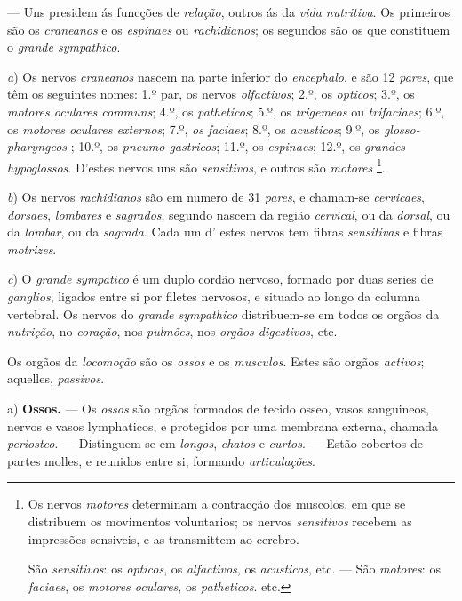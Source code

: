 --- Uns presidem ás funcções de \emph{relação}, outros ás da \emph{vida nutritiva}. Os primeiros são os \emph{craneanos} e os \emph{espinaes} ou \emph{rachidianos}; os segundos são os que constituem o \emph{grande sympathico}.

\emph{a}) Os nervos \emph{craneanos} nascem na parte inferior do \emph{encephalo}, e são 12 \emph{pares}, que têm os seguintes nomes: 1.º par, os nervos \emph{olfactivos}; 2.º, os \emph{opticos}; 3.º, os \emph{motores oculares communs}; 4.º, os \emph{patheticos}; 5.º, os \emph{trigemeos} ou \emph{trifaciaes}; 6.º, os \emph{motores oculares externos}; 7.º, \emph{os faciaes}; 8.º, os \emph{acusticos}; 9.º, os \emph{glosso-pharyngeos} ; 10.º, os \emph{pneumo-gastricos}; 11.º, os \emph{espinaes}; 12.º, os \emph{grandes hypoglossos}. D'estes nervos uns são \emph{sensitivos}, e outros são \emph{motores} \footnote{Os nervos \emph{motores} determinam a contracção dos muscolos, em que se distribuem os movimentos voluntarios; os nervos \emph{sensitivos} recebem as impressões sensiveis, e as transmittem ao cerebro.\par São \emph{sensitivos}: os \emph{opticos}, os \emph{alfactivos}, os \emph{acusticos}, etc. --- São \emph{motores}: os \emph{faciaes}, os \emph{motores oculares}, os \emph{patheticos}. etc.}.

\emph{b}) Os nervos \emph{rachidianos} são em numero de 31 \emph{pares}, e chamam-se \emph{cervicaes}, \emph{dorsaes}, \emph{lombares} e \emph{sagrados}, segundo nascem da região \emph{cervical}, ou da \emph{dorsal}, ou da \emph{lombar}, ou da \emph{sagrada}. Cada um d' estes nervos tem fibras \emph{sensitivas} e fibras \emph{motrizes}.

\emph{c}) O \emph{grande sympatico} é um duplo cordão nervoso, formado por duas series de \emph{ganglios}, ligados entre si por filetes nervosos, e situado ao longo da columna vertebral. Os nervos do \emph{grande sympathico} distribuem-se em todos os orgãos da \emph{nutrição}, no \emph{coração}, nos \emph{pulmões}, nos \emph{orgãos digestivos}, etc.


 
Os orgãos da \emph{locomoção} são os \emph{ossos} e os \emph{musculos}. Estes são orgãos \emph{activos}; aquelles, \emph{passivos}.

a) \textbf{Ossos.} --- Os \emph{ossos} são orgãos formados de tecido osseo, vasos sanguineos, nervos e vasos lymphaticos, e protegidos por uma membrana externa, chamada \emph{periosteo}. --- Distinguem-se em \emph{longos}, \emph{chatos} e \emph{curtos}. --- Estão cobertos de partes molles, e reunidos entre si, formando \emph{articulações}.

